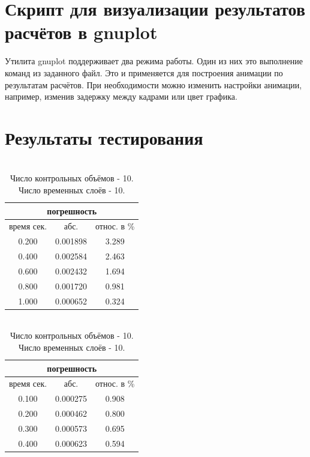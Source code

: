 \documentclass[oneside, final, 14pt]{report}
\begin{document}
\section{Скрипт для визуализации результатов расчётов в gnuplot}
Утилита gnuplot поддерживает два режима работы. Один из них это выполнение команд из заданного файл. Это и применяется для построения анимации по результатам расчётов. При необходимости можно изменить настройки анимации, например, изменив задержку между кадрами или цвет графика. 
\large
{}
\Large

\newpage
\def \hfillx {\hspace*{-\textwidth} \hfill}
\begin{table}[th!]
\centering
\section{Результаты тестирования}
\begin{minipage}{0.3\textwidth}
\centering
\caption{\\ Число контрольных объёмов - 5.\\Число временных слоёв - 5.}
\begin{tabular}{|c|c|c|}
\hline \multicolumn{3}{|c|}{ погрешность} \\
\hline 
время сек. & абс. & относ. в \%
\\
\hline 
0.200 & 0.001898 & 3.289 \\
0.400 & 0.002584 & 2.463 \\
0.600 & 0.002432 & 1.694 \\
0.800 & 0.001720 & 0.981 \\
1.000 & 0.000652 & 0.324 \\
\hline
\end{tabular}
%
%
%
\end{minipage}
\hfillx
\begin{minipage}{0.3\textwidth}
\centering
\caption{\\ Число контрольных объёмов - 10. \\ Число временных слоёв - 10.}
\begin{tabular}{|c|c|c|}
\hline \multicolumn{3}{|c|}{ погрешность} \\
\hline 
время сек. & абс. & относ. в \%
\\
\hline 
0.100 & 0.000275 & 0.908 \\
0.200 & 0.000462 & 0.800 \\
0.300 & 0.000573 & 0.695 \\
0.400 & 0.000623 & 0.594 \\

\end{tabular}
\end{minipage}
\end{table}
\end{document}
